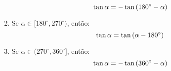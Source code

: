 \begin{frame}
\begin{columns}[onlytextwidth]
\begin{column}{0.49\textwidth}
\begin{highlight}
\begin{enumerate}
          \begin{equation*}
            \tan{\alpha}=-\tan{(180^{\circ}-\alpha)}\vspace*{-0.2cm}
          \end{equation*}
          \item Se $\alpha\in[180^{\circ},270^{\circ})$, então:\vspace*{-0.2cm}
          \begin{equation*}
            \tan{\alpha}=\tan{(\alpha-180^{\circ})}\vspace*{-0.2cm}
          \end{equation*}
          \item Se $\alpha\in(270^{\circ},360^{\circ}]$, então:\vspace*{-0.2cm}
          \begin{equation*}
            \tan{\alpha}=-\tan{(360^{\circ}-\alpha)}\vspace*{-0.2cm}
          \end{equation*}
        \end{enumerate}
      \end{highlight}
    \end{column}
  \end{columns}
\end{frame}

